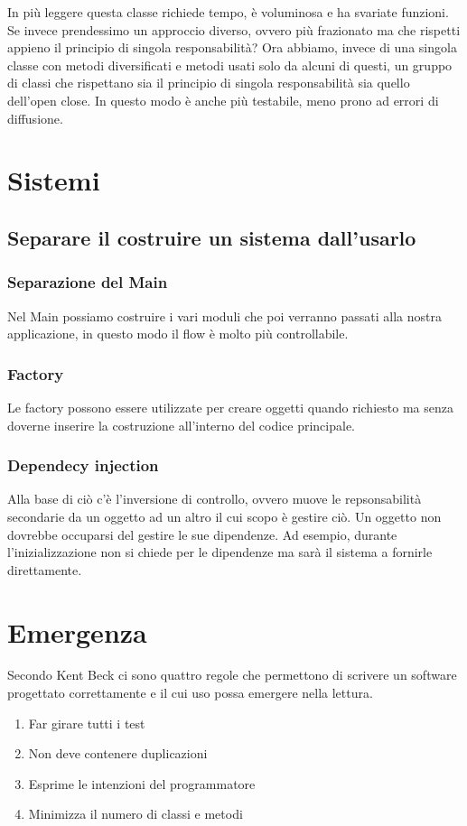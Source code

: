 \documentclass[11pt,a4paper]{book}
\begin{document}
In più leggere questa classe richiede tempo, è voluminosa e ha svariate funzioni. Se invece prendessimo un approccio diverso, ovvero più frazionato ma che rispetti appieno il principio di singola responsabilità?
\label{code: 058}
Ora abbiamo, invece di una singola classe con metodi diversificati e metodi usati solo da alcuni di questi, un gruppo di classi che rispettano sia il principio di singola responsabilità sia quello dell'open close. In questo modo è anche più testabile, meno prono ad errori di diffusione.

\chapter{Sistemi}
\section{Separare il costruire un sistema dall'usarlo}
\subsection{Separazione del Main}
Nel Main possiamo costruire i vari moduli che poi verranno passati alla nostra applicazione, in questo modo il flow è molto più controllabile.

\subsection{Factory}
Le factory possono essere utilizzate per creare oggetti quando richiesto ma senza doverne inserire la costruzione all'interno del codice principale.

\subsection{Dependecy injection}
Alla base di ciò c'è l'inversione di controllo, ovvero muove le repsonsabilità secondarie da un oggetto ad un altro il cui scopo è gestire ciò. Un oggetto non dovrebbe occuparsi del gestire le sue dipendenze. Ad esempio, durante l'inizializzazione non si chiede per le dipendenze ma sarà il sistema a fornirle direttamente.

\chapter{Emergenza}
Secondo Kent Beck ci sono quattro regole che permettono di scrivere un software progettato correttamente e il cui uso possa emergere nella lettura.
\begin{enumerate}
	\item Far girare tutti i test
	\item Non deve contenere duplicazioni
	\item Esprime le intenzioni del programmatore
	\item Minimizza il numero di classi e metodi
\end{enumerate}
\end{document}

